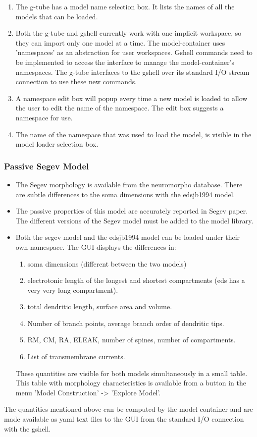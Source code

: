 \documentclass[12pt]{article}
\begin{document}
\begin{enumerate}
\item The g-tube has a model name selection box.  It lists the names
  of all the models that can be loaded.
\item Both the g-tube and gshell currently work with one implicit
  workspace, so they can import only one model at a time.  The
  model-container uses 'namespaces' as an abstraction for user
  workspaces.  Gshell commands need to be implemented to access the
  interface to manage the model-container's namespaces.  The g-tube
  interfaces to the gshell over its standard I/O stream connection to
  use these new commands.
\item A namespace edit box will popup every time a new model is loaded
  to allow the user to edit the name of the namespace.  The edit box
  suggests a namespace for use.
\item The name of the namespace that was used to load the model, is
  visible in the model loader selection box.
\end{enumerate}

\subsubsection{Passive Segev Model}
\begin{itemize}
\item The Segev morphology is available from the
  neuromorpho database.  There are subtle differences to the soma
  dimensions with the edsjb1994 model.
\item The passive properties of this model are accurately reported in
  Segev paper.  The different versions of the Segev model must be
  added to the model library.
\item Both the segev model and the edsjb1994 model can be loaded under
  their own namespace.  The GUI displays the differences in:
  \begin{enumerate}
  \item soma dimensions (different between the two models)
  \item electrotonic length of the longest and shortest compartments (eds has a very very long compartment).
  \item total dendritic length, surface area and volume.
  \item Number of branch points, average branch order of dendritic tips.
  \item RM, CM, RA, ELEAK, number of spines, number of compartments.
  \item List of transmembrane currents.
  \end{enumerate}
  These quantities are visible for both models simultaneously in a
  small table.  This table with morphology characteristics is
  available from a button in the menu 'Model Construction' -> 'Explore
  Model'.
\end{itemize}
The quantities mentioned above can be computed by the model container
and are made available as yaml text files to the GUI from the standard
I/O connection with the gshell.
\end{document}
